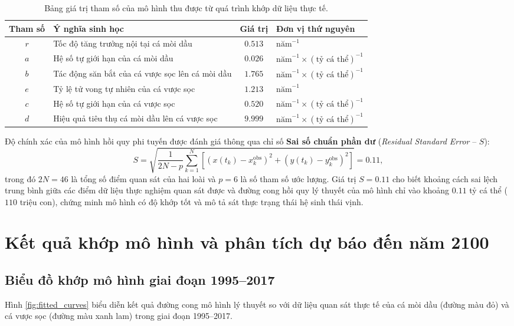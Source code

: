 \begin{table}[h!]
\centering
\caption{Bảng giá trị tham số của mô hình thu được từ quá trình khớp dữ liệu thực tế.}
\label{tab:model_parameters}
\vspace{0.2cm}
\begin{tabularx}{0.92\textwidth}{c l c X}
\toprule
\textbf{Tham số} & \textbf{Ý nghĩa sinh học} & \textbf{Giá trị} & \textbf{Đơn vị thứ nguyên} \\
\midrule
$r$ & Tốc độ tăng trưởng nội tại cá mòi dầu & $0.513$ & $\text{năm}^{-1}$ \\
$a$ & Hệ số tự giới hạn của cá mòi dầu & $0.026$ & $\text{năm}^{-1} \times (\text{tỷ cá thể})^{-1}$ \\
$b$ & Tác động săn bắt của cá vược sọc lên cá mòi dầu & $1.765$ & $\text{năm}^{-1} \times (\text{tỷ cá thể})^{-1}$ \\
$e$ & Tỷ lệ tử vong tự nhiên của cá vược sọc & $1.213$ & $\text{năm}^{-1}$ \\
$c$ & Hệ số tự giới hạn của cá vược sọc & $0.520$ & $\text{năm}^{-1} \times (\text{tỷ cá thể})^{-1}$ \\
$d$ & Hiệu quả tiêu thụ cá mòi dầu lên cá vược sọc & $9.999$ & $\text{năm}^{-1} \times (\text{tỷ cá thể})^{-1}$ \\
\bottomrule
\end{tabularx}
\end{table}

Độ chính xác của mô hình hồi quy phi tuyến được đánh giá thông qua chỉ số \textbf{Sai số chuẩn phần dư} (\textit{Residual Standard Error} -- $S$):
\begin{equation}
S = \sqrt{\frac{1}{2N - p} \sum_{k=1}^N \left[ \left(x(t_k) - x_k^{\text{obs}}\right)^2 + \left(y(t_k) - y_k^{\text{obs}}\right)^2 \right]} = 0.11,
\end{equation}
trong đó $2N = 46$ là tổng số điểm quan sát của hai loài và $p = 6$ là số tham số ước lượng. Giá trị $S = 0.11$ cho biết khoảng cách sai lệch trung bình giữa các điểm dữ liệu thực nghiệm quan sát được và đường cong hồi quy lý thuyết của mô hình chỉ vào khoảng $0.11$ tỷ cá thể ($110$ triệu con), chứng minh mô hình có độ khớp tốt và mô tả sát thực trạng thái hệ sinh thái vịnh.

\section{Kết quả khớp mô hình và phân tích dự báo đến năm 2100}
\label{sec:model_results}

\subsection{Biểu đồ khớp mô hình giai đoạn 1995--2017}
Hình \ref{fig:fitted_curves} biểu diễn kết quả đường cong mô hình lý thuyết so với dữ liệu quan sát thực tế của cá mòi dầu (đường màu đỏ) và cá vược sọc (đường màu xanh lam) trong giai đoạn 1995--2017.

